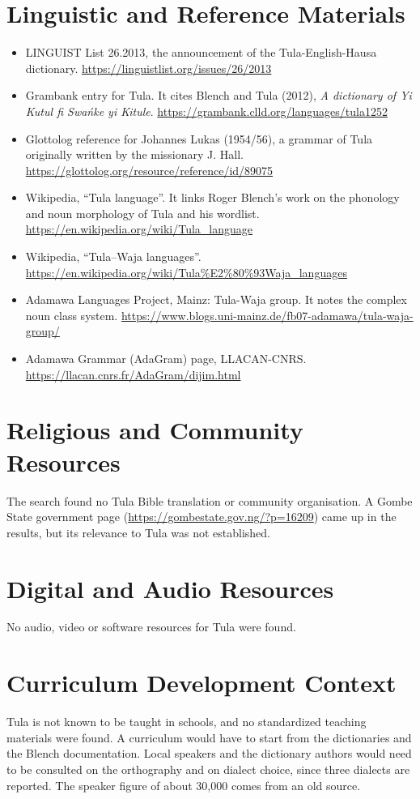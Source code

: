 \documentclass[12pt]{article}
\begin{document}
\section{Linguistic and Reference Materials}
\begin{itemize}
\item LINGUIST List 26.2013, the announcement of the Tula-English-Hausa dictionary. \url{https://linguistlist.org/issues/26/2013}
\item Grambank entry for Tula. It cites Blench and Tula (2012), \emph{A dictionary of Yi Kutul\textepsilon{} fi Swa\'nke yi Kitule}. \url{https://grambank.clld.org/languages/tula1252}
\item Glottolog reference for Johannes Lukas (1954/56), a grammar of Tula originally written by the missionary J. Hall. \url{https://glottolog.org/resource/reference/id/89075}
\item Wikipedia, ``Tula language''. It links Roger Blench's work on the phonology and noun morphology of Tula and his wordlist. \url{https://en.wikipedia.org/wiki/Tula_language}
\item Wikipedia, ``Tula--Waja languages''. \url{https://en.wikipedia.org/wiki/Tula%E2%80%93Waja_languages}
\item Adamawa Languages Project, Mainz: Tula-Waja group. It notes the complex noun class system. \url{https://www.blogs.uni-mainz.de/fb07-adamawa/tula-waja-group/}
\item Adamawa Grammar (AdaGram) page, LLACAN-CNRS. \url{https://llacan.cnrs.fr/AdaGram/dijim.html}
\end{itemize}

\section{Religious and Community Resources}
The search found no Tula Bible translation or community organisation. A Gombe State government page (\url{https://gombestate.gov.ng/?p=16209}) came up in the results, but its relevance to Tula was not established.

\section{Digital and Audio Resources}
No audio, video or software resources for Tula were found.

\section{Curriculum Development Context}
Tula is not known to be taught in schools, and no standardized teaching materials were found. A curriculum would have to start from the dictionaries and the Blench documentation. Local speakers and the dictionary authors would need to be consulted on the orthography and on dialect choice, since three dialects are reported. The speaker figure of about 30,000 comes from an old source.
\end{document}
